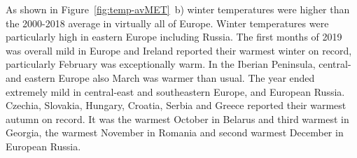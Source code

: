 As shown in Figure~\ref{fig:temp-avMET}~b) winter temperatures were higher than the 2000-2018 average in virtually all of Europe. Winter temperatures were particularly high in eastern Europe including Russia. The first months of 2019 was overall mild in Europe and Ireland reported their warmest winter on record, particularly February was exceptionally warm. In the Iberian Peninsula, central- and eastern Europe also March was warmer than usual. The year ended extremely mild in central-east and southeastern Europe, and European Russia. Czechia, Slovakia, Hungary, Croatia, Serbia and Greece reported their warmest autumn on record. It was the warmest October in Belarus and third warmest in Georgia, the warmest November in Romania and second warmest December in European Russia.

\begin{figure}[H]
  \centering

\end{figure}
